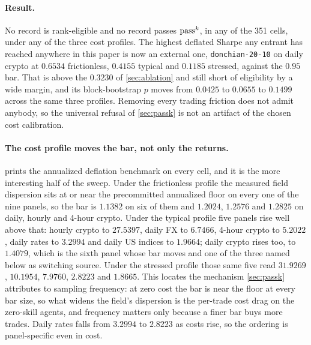 \paragraph{Result.} No record is rank-eligible and no record passes $\text{pass}^{k}$, in any of the 351 cells, under any of the three cost profiles. The highest deflated Sharpe any entrant has reached anywhere in this paper is now an external one, \texttt{donchian-20-10} on daily crypto at $0.6534$ frictionless, $0.4155$ typical and $0.1185$ stressed, against the $0.95$ bar. That is above the $0.3230$ of \cref{sec:ablation} and still short of eligibility by a wide margin, and its block-bootstrap $p$ moves from $0.0425$ to $0.0655$ to $0.1499$ across the same three profiles. Removing every trading friction does not admit anybody, so the universal refusal of \cref{sec:passk} is not an artifact of the chosen cost calibration.

\paragraph{The cost profile moves the bar, not only the returns.}  prints the annualized deflation benchmark on every cell, and it is the more interesting half of the sweep. Under the frictionless profile the measured field dispersion sits at or near the precommitted annualized floor on every one of the nine panels, so the bar is $1.1382$ on six of them and $1.2024$, $1.2576$ and $1.2825$ on daily, hourly and 4-hour crypto. Under the typical profile five panels rise well above that: hourly crypto to $27.5397$, daily FX to $6.7466$, 4-hour crypto to $5.2022$, daily rates to $3.2994$ and daily US indices to $1.9664$; daily crypto rises too, to $1.4079$, which is the sixth panel whose bar moves and one of the three named below as switching source. Under the stressed profile those same five read $31.9269$, $10.1954$, $7.9760$, $2.8223$ and $1.8665$. This locates the mechanism \cref{sec:passk} attributes to sampling frequency: at zero cost the bar is near the floor at every bar size, so what widens the field's dispersion is the per-trade cost drag on the zero-skill agents, and frequency matters only because a finer bar buys more trades. Daily rates falls from $3.2994$ to $2.8223$ as costs rise, so the ordering is panel-specific even in cost.

